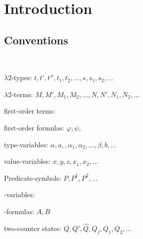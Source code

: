 \section{Introduction}

\subsection{Conventions}
~

$\lambda2$-types: $t, t', t'', t_1, t_2, \dots,s,s_1,s_2,\dots$

$\lambda2$-terms: $M, M', M_1, M_2,\dots, N, N', N_1, N_2, \dots$

first-order terms: 

first-order formulas: $\varphi,\psi,$

type-variables: $\alpha, a, ,\alpha_1, \alpha_2, \dots, \beta, b, \dots$

value-variables: $x,y,z, x_1 , x_2 ,\dots$

Predicate-symbols: $P,P^1,P^2,\dots$

\SysP-variables:

\SysP-formulas: $A, B$

two-counter states: $Q,Q',\widehat{Q},Q_f,Q_1,Q_2,\dots$
